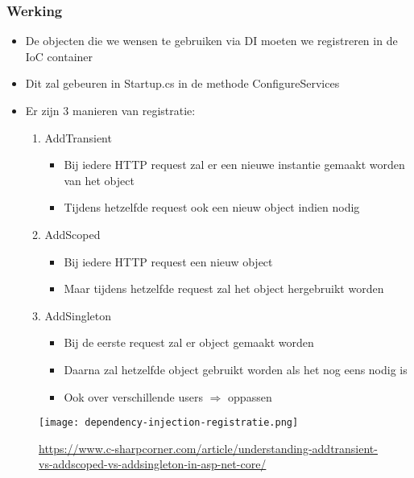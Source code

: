 \documentclass{article}
\begin{document}
\subsubsection{Werking}

\begin{itemize}
    \item De objecten die we wensen te gebruiken via DI moeten we registreren in de IoC container
    \item Dit zal gebeuren in Startup.cs in de methode ConfigureServices
    \item Er zijn 3 manieren van registratie:
    \begin{enumerate}
        \item AddTransient
        \begin{itemize}
            \item Bij iedere HTTP request zal er een nieuwe instantie gemaakt worden van het object
            \item Tijdens hetzelfde request ook een nieuw object indien nodig
        \end{itemize}
        \item AddScoped
        \begin{itemize}
            \item Bij iedere HTTP request een nieuw object
            \item Maar tijdens hetzelfde request zal het object hergebruikt worden
        \end{itemize}
        \item AddSingleton
        \begin{itemize}
            \item Bij de eerste request zal er object gemaakt worden
            \item Daarna zal hetzelfde object gebruikt worden als het nog eens nodig is
            \item Ook over verschillende users $\Rightarrow$ oppassen
        \end{itemize}
    \end{enumerate}
\end{itemize}


\begin{figure}[H]
    \centering
    \texttt{[image: dependency-injection-registratie.png]}
    \caption{\url{https://www.c-sharpcorner.com/article/understanding-addtransient-vs-addscoped-vs-addsingleton-in-asp-net-core/}}
\end{figure}
\end{document}
